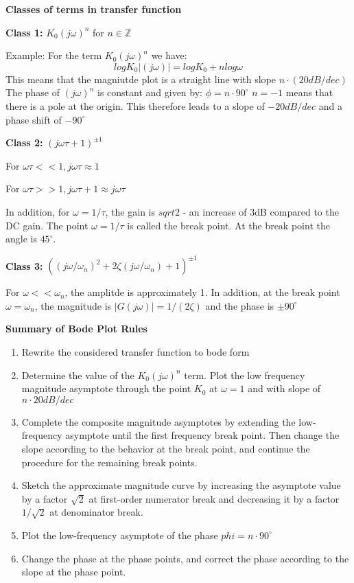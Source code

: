 \newpage
\textbf{Classes of terms in transfer function}

\textbf{Class 1:} $K_0(j\omega)^n$ for $n\in \mathbb{Z}$

Example: For the term $K_0(j\omega)^n$ we have:
$$ log K_0 |(j\omega)| = log K_0 + n log \omega$$
This means that the magniutde plot is a straight line with slope $n \cdot (20 dB/dec)$
The phase of $(j\omega)^n$ is constant and given by: $\phi = n \cdot 90^{\circ}$
$n=-1$ means that there is a pole at the origin. This therefore leads to a slope of $-20 dB/dec$ and a phase shift of $-90^{\circ}$

\textbf{Class 2:} $(j\omega \tau + 1)^{\pm1}$

For $\omega \tau << 1, j\omega \tau \approx 1$

For $\omega \tau >> 1, j\omega \tau + 1 \approx j\omega \tau$

In addition, for $\omega = 1/\tau$, the gain is $sqrt{2}$ - an increase of 3dB compared to the DC gain.
The point $\omega = 1/\tau$ is called the break point. At the break point the angle is $45^{\circ}$.

\textbf{Class 3:} $((j\omega / \omega_n)^2 + 2\zeta (j\omega / \omega_n) + 1)^{\pm1}$

For $\omega << \omega_n$, the amplitde is approximately 1.
In addition, at the break point $\omega = \omega_n$, the magnitude is $|G(j\omega)| = 1/(2\zeta)$
and the phase is $\pm90^{\circ}$


\textbf{Summary of Bode Plot Rules}

\begin{enumerate}
	\item{Rewrite the considered transfer function to bode form}
	\item{Determine the value of the $K_0(j\omega)^n$ term. Plot the low frequency magnitude
	            asymptote through the point $K_0$ at $\omega = 1$ and with slope of $n \cdot 20 dB/dec$}
	\item{Complete the composite magnitude asymptotes by extending the low-frequency
	            asymptote until the first frequency break point. Then change the slope according to
	            the behavior at the break point, and continue the procedure for the remaining break points.}
	\item{Sketch the approximate magnitude curve by increasing the asymptote value by a factor $\sqrt{2}$ at first-order numerator
	            break and decreasing it by a factor $1/\sqrt{2}$ at denominator break.}
	\item{Plot the low-frequency asymptote  of the phase $phi=n \cdot 90^{\circ}$}
	\item{Change the phase at the phase points, and correct the phase according to the slope
	            at the phase point.}
\end{enumerate}

